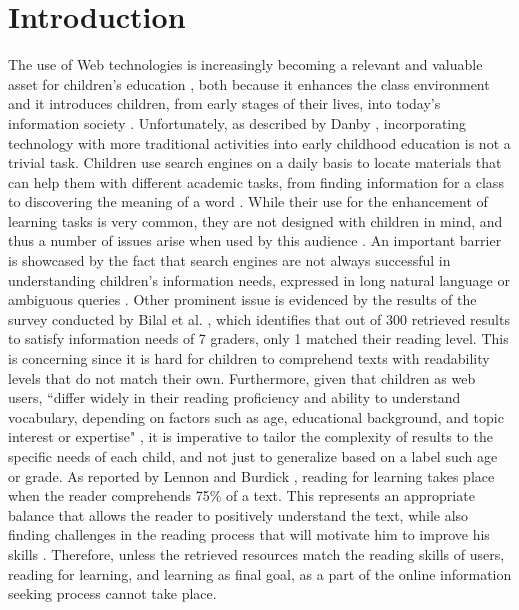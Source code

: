 \documentclass{sig-alternate-05-2015}
\begin{document}
\section{Introduction}
The use of Web technologies is increasingly becoming a relevant and valuable asset for children's education \cite{Kni14}, both because it enhances the class environment and it introduces children, from early stages of their lives, into today's information society \cite{Sad12}. Unfortunately, as described by Danby \cite{Dan13}, incorporating technology with more traditional activities into early childhood education is not a trivial task. Children use search engines on a daily basis to locate materials that can help them with different academic tasks, from finding information for a class to discovering the meaning of a word \cite{Kni14}. While their use for the enhancement of learning tasks is very common, they are not designed with children in mind, and thus a number of issues arise when used by this audience \cite{Gos13}. An important barrier is showcased by the fact that search engines are not always successful in understanding children's information needs, expressed in long natural language or ambiguous queries \cite{Bil13}. Other  prominent issue is evidenced by the results of the survey conducted by Bilal et al. \cite{Bil13}, which identifies that out of 300 retrieved results to satisfy information needs of 7 graders, only 1 matched their reading level. This is concerning since it is hard for children to comprehend texts with readability levels that do not match their own. Furthermore, given that children as web users, ``differ widely in their reading proficiency and ability to understand vocabulary, depending on factors such as age, educational background, and topic interest or expertise" \cite{Col11}, it is imperative to tailor the complexity of results to the specific needs of each child, and not just to generalize based on a label such age or grade. As reported by Lennon and Burdick \cite{Len04}, reading for learning takes place when the reader comprehends 75\% of a text. This represents an appropriate balance that allows the reader to positively understand the text, while also finding challenges in the reading process that will motivate him to improve his skills \cite{Len04}. Therefore, unless the retrieved resources match the reading skills of users, reading for learning, and learning as final goal, as a part of the online information seeking process cannot take place. 
\end{document}
